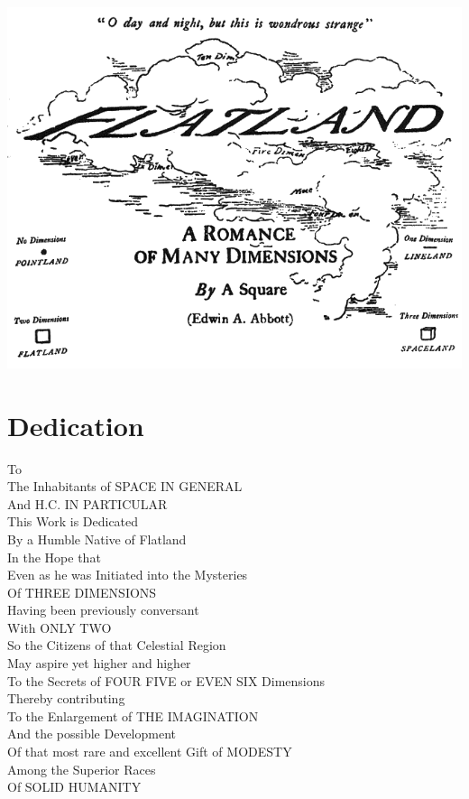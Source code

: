 \documentclass[10pt, kindle, oneside]{kindle}
\begin{document}
\maketitle
\null\vfill
\begin{center}
    \includegraphics[trim=0mm 0mm 0mm 0mm,width=\linewidth]{flatland_cover}
\end{center}
\vfill\null
\clearpage


\frontmatter
\chapter*{Dedication}


\footnotesize
\begin{center}
To\\
The Inhabitants of SPACE IN GENERAL\\
And H.C. IN PARTICULAR\\
This Work is Dedicated\\
By a Humble Native of Flatland\\
In the Hope that\\
Even as he was Initiated into the Mysteries\\
Of THREE DIMENSIONS\\
Having been previously conversant\\
With ONLY TWO\\
So the Citizens of that Celestial Region\\
May aspire yet higher and higher\\
To the Secrets of FOUR FIVE or EVEN SIX Dimensions\\
Thereby contributing\\
To the Enlargement of THE IMAGINATION\\
And the possible Development\\
Of that most rare and excellent Gift of MODESTY\\
Among the Superior Races\\
Of SOLID HUMANITY\\
\end{center}
\normalsize
\end{document}
